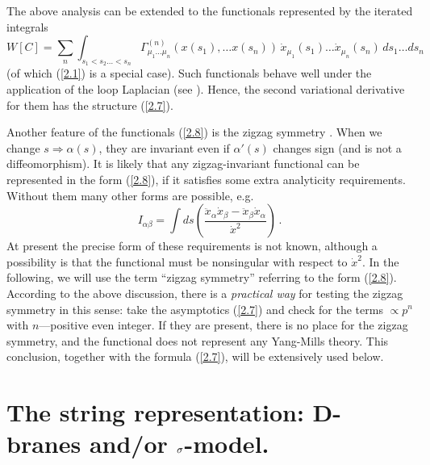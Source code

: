 \documentclass[a4paper,12pt]{article}
\numberwithin{equation}{section}
\begin{document}
The above analysis can be extended to the functionals represented by the iterated
integrals 
\begin{equation}
\label{2.8}
W[C]=\sum _{n}\int _{s_{1}<s_{2}\ldots <s_{n}}\Gamma ^{(n)}_{\mu _{1}\ldots \mu _{n}}(x(s_{1}),\ldots x(s_{n}))\, \dot{x}_{\mu _{1}}(s_{1})\ldots \dot{x}_{\mu _{n}}(s_{n})\, ds_{1}\ldots ds_{n}
\end{equation}
 (of which (\ref{2.1}) is a special case). Such functionals behave well under
the application of the loop Laplacian (see \cite{8}). Hence, the second variational
derivative for them has the structure (\ref{2.7}).

Another feature of the functionals (\ref{2.8}) is the zigzag symmetry \cite{1}.
When we change \( s\Rightarrow \alpha (s) \), they are invariant even if \( \alpha '(s) \)
changes sign (and is not a diffeomorphism). It is likely that any zigzag-invariant
functional can be represented in the form (\ref{2.8}), if it satisfies some
extra analyticity requirements. Without them many other forms are possible,
e.g.
\[
I_{\alpha \beta }=\int ds\left( \frac{\ddot{x}_{\alpha }\dot{x}_{\beta }-\ddot{x}_{\beta }\dot{x}_{\alpha }}{\dot{x}^{2}}\right) \, .\]
 At present the precise form of these requirements is not known, although a
possibility is that the functional must be nonsingular with respect to \( \dot{x}^{2} \).
In the following, we will use the term ``zigzag symmetry'' referring to the
form (\ref{2.8}). According to the above discussion, there is a \emph{practical
way} for testing the zigzag symmetry in this sense: take the asymptotics (\ref{2.7})
and check for the \emph{}terms \emph{\( \varpropto p^{n} \)} with \( n \)---positive
even integer. If they are present, there is no place for the zigzag symmetry,
and the functional does not represent any Yang-Mills theory. This conclusion,
together with the formula (\ref{2.7}), will be extensively used below.


\section{The string representation: D-branes and/or \protect\( \sigma \protect \)-model.}
\end{document}
